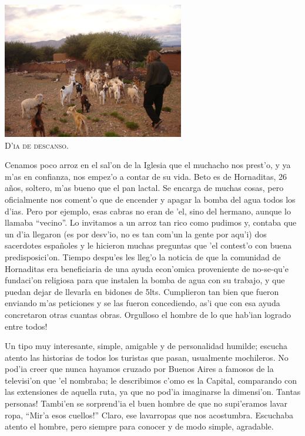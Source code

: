\begin{center}
\includegraphics[width=300px]{images/DSC0446.JPG}
\textsc{\\D'ia de descanso.}
\end{center}

Cenamos poco arroz en el sal'on de la Iglesia que el muchacho nos prest'o, y ya
m'as en confianza, nos empez'o a contar de su vida. Beto es de Hornaditas, 26
a\~nos, soltero, m'as bueno que el pan lactal. Se encarga de muchas cosas, pero
oficialmente nos coment'o que de encender y apagar la bomba del agua todos los
d'ias. Pero por ejemplo, esas cabras no eran de 'el, sino del hermano, aunque lo
llamaba ``vecino''. Lo invitamos a un arroz tan rico como pudimos y, contaba que
un d'ia llegaron (es por desv'io, no es tan com'un la gente por aqu'i) dos
sacerdotes espa\~noles y le hicieron muchas preguntas que 'el contest'o con
buena predisposici'on. Tiempo despu'es les lleg'o la noticia de que la comunidad
de Hornaditas era beneficiaria de una ayuda econ'omica proveniente de no-se-qu'e
fundaci'on religiosa para que instalen la bomba de agua con su trabajo, y que
puedan dejar de llevarla en bidones de 5lts. Cumplieron tan bien que fueron
enviando m'as peticiones y se las fueron concediendo, as'i que con esa ayuda
concretaron otras cuantas obras. \textexclamdown Orgulloso el hombre de lo que
hab'ian logrado entre todos!

Un tipo muy interesante, simple, amigable y de personalidad humilde; escucha
atento las historias de todos los turistas que pasan, usualmente mochileros. No
pod'ia creer que nunca hayamos cruzado por Buenos Aires a famosos de la
televisi'on que 'el nombraba; le describimos c'omo es la Capital, comparando con
las extensiones de aquella ruta, ya que no pod'ia imaginarse la dimensi'on.
\textexclamdown Tantas personas! Tambi'en se sorprend'ia el buen hombre de que
no supi'eramos lavar ropa, ``\textexclamdown Mir'a esos cuellos!'' Claro, ese
lavarropas que nos acostumbra. Escuchaba atento el hombre, pero siempre para
conocer y de modo simple, agradable.

